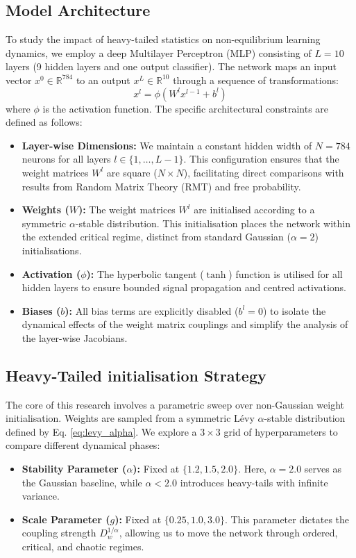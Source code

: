 \documentclass[11pt,a4paper]{article}
\begin{document}
\subsection{Model Architecture}
To study the impact of heavy-tailed statistics on non-equilibrium learning dynamics, we employ a deep Multilayer Perceptron (MLP) consisting of $L=10$ layers (9 hidden layers and one output classifier). The network maps an input vector $x^0 \in \mathbb{R}^{784}$ to an output $x^L \in \mathbb{R}^{10}$ through a sequence of transformations:
\begin{equation}
    x^l = \phi(W^l x^{l-1} + b^l)
\end{equation}
where $\phi$ is the activation function. The specific architectural constraints are defined as follows:

\begin{itemize}
    \item \textbf{Layer-wise Dimensions:} We maintain a constant hidden width of $N=784$ neurons for all layers $l \in \{1, \dots, L-1\}$. This configuration ensures that the weight matrices $W^l$ are square ($N \times N$), facilitating direct comparisons with results from Random Matrix Theory (RMT) and free probability.
    \item \textbf{Weights ($W$):} The weight matrices $W^l$ are initialised according to a symmetric $\alpha$-stable distribution. This initialisation places the network within the extended critical regime, distinct from standard Gaussian ($\alpha=2$) initialisations.
    \item \textbf{Activation ($\phi$):} The hyperbolic tangent ($\tanh$) function is utilised for all hidden layers to ensure bounded signal propagation and centred activations.
    \item \textbf{Biases ($b$):} All bias terms are explicitly disabled ($b^l=0$) to isolate the dynamical effects of the weight matrix couplings and simplify the analysis of the layer-wise Jacobians.
\end{itemize}

\subsection{Heavy-Tailed initialisation Strategy}
The core of this research involves a parametric sweep over non-Gaussian weight initialisation. Weights are sampled from a symmetric L\'{e}vy $\alpha$-stable distribution defined by Eq. \ref{eq:levy_alpha}. We explore a $3 \times 3$ grid of hyperparameters to compare different dynamical phases:
\begin{itemize}
    \item \textbf{Stability Parameter ($\alpha$):} Fixed at $\{1.2, 1.5, 2.0\}$. Here, $\alpha=2.0$ serves as the Gaussian baseline, while $\alpha < 2.0$ introduces heavy-tails with infinite variance.
    \item \textbf{Scale Parameter ($g$):} Fixed at $\{0.25, 1.0, 3.0\}$. This parameter dictates the coupling strength $D_w^{1/\alpha}$, allowing us to move the network through ordered, critical, and chaotic regimes.
\end{itemize}
\end{document}
